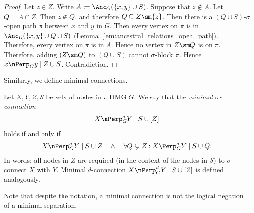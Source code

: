 \begin{proof}
  Let $z \in Z$. Write $A := \Anc_G(\{x,y\} \cup S)$.
  Suppose that $z \notin A$. 
  Let $Q = A \cap Z$.
  Then $z \notin Q$, and therefore $Q \subseteq Z \sm \{z\}$.
  Then there is a $(Q \cup S)$-$\sigma$-open path $\pi$ between $x$ and $y$ in $G$.
  Then every vertex on $\pi$ is in $\Anc_G(\{x,y\} \cup Q \cup S)$ (Lemma~\ref{lem:ancestral_relations_open_path}).
  Therefore, every vertex on $\pi$ is in $A$.
  Hence no vertex in $Z \sm Q$ is on $\pi$.
  Therefore, adding $(Z \sm Q)$ to $(Q \cup S)$ cannot $\sigma$-block $\pi$.
  Hence $x \nPerp_G y \mid Z \cup S$. Contradiction.
\end{proof}

Similarly, we define minimal connections.
\begin{Def}\label{def:min_con}
Let $X,Y,Z,S$ be sets of nodes in a DMG $G$. 
We say that the \emph{minimal $\sigma$-connection}
  $$X \nPerp_G^\sigma Y \mid S \cup [Z]$$
holds if and only if
  $$X \nPerp_G^\sigma Y \mid S \cup Z\quad\land\quad \forall Q \subsetneq Z: X \Perp_G^\sigma Y \mid S \cup Q.$$
In words: all nodes in $Z$ are required (in the context of the nodes in $S$) to $\sigma$-connect $X$ with $Y$.
Minimal $d$-connection $X \nPerp_G^d Y \mid S \cup [Z]$ is defined analogously.
\end{Def}
Note that despite the notation, a minimal connection is not the logical negation of a minimal separation.

